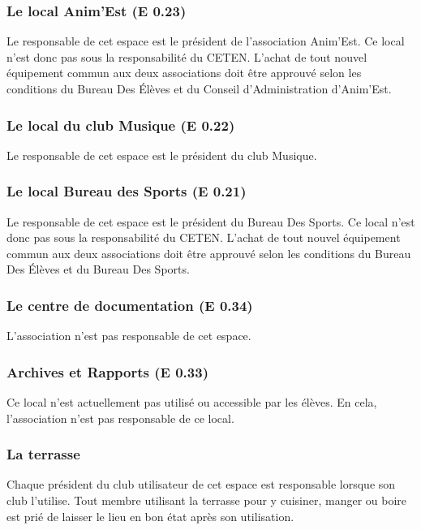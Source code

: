 \documentclass{article} %
\begin{document}
			\subsubsection{Le local Anim’Est (E 0.23)}

				Le responsable de cet espace est le président de l’association
				Anim’Est. Ce local n’est donc pas sous la responsabilité du
				CETEN. L’achat de tout nouvel équipement commun aux deux
				associations doit être approuvé selon les conditions du Bureau
				Des Élèves et du Conseil d'Administration d’Anim’Est.

			\subsubsection{Le local du club Musique (E 0.22)}

				Le responsable de cet espace est le président du club Musique.

			\subsubsection{Le local Bureau des Sports (E 0.21)}

				Le responsable de cet espace est le président du Bureau Des
				Sports. Ce local n’est donc pas sous la responsabilité du
				CETEN. L’achat de tout nouvel équipement commun aux deux
				associations doit être approuvé selon les conditions du Bureau
				Des Élèves et du Bureau Des Sports.

			\subsubsection{Le centre de documentation (E 0.34)}

				L’association n’est pas responsable de cet espace.

			\subsubsection{Archives et Rapports (E 0.33)}

				Ce local n’est actuellement pas utilisé ou accessible par les
				élèves. En cela, l’association n’est pas responsable de ce
				local.

			\subsubsection{La terrasse}

				Chaque président du club utilisateur de cet espace est
				responsable lorsque son club l’utilise. Tout membre utilisant
				la terrasse pour y cuisiner, manger ou boire est prié de
				laisser le lieu en bon état après son utilisation.
\end{document}
